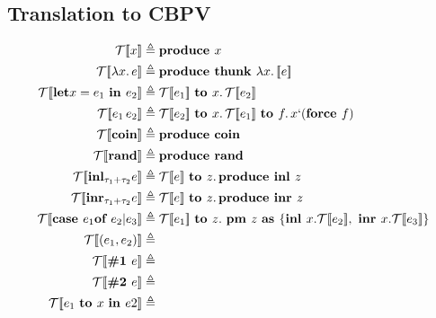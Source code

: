 \documentclass{article}
\begin{document}
\subsection{Translation to CBPV}
	\begin{equation*}
		\begin{split}
			\mathcal{T} [\![x]\!] &\triangleq 
			\text{\bf produce } x \\
			\mathcal{T} [\![\lambda x.\, e]\!] &\triangleq 
			\text{\bf produce thunk } \lambda x.\, \mathcal[\![ e ]\!] \\
			\mathcal{T} [\![\text{\bf let} x = e_1 \text{ \bf in } e_2]\!] &\triangleq 
			\mathcal{T}[\![e_1]\!] \text{ \bf to } x.\, \mathcal{T}[\![e_2]\!]\\
			\mathcal{T} [\![e_1\, e_2]\!] &\triangleq 
			\mathcal{T}[\![e_2]\!] \text{ \bf to } x.\, \mathcal{T}[\![e_1]\!] \text{ \bf to } f.\, x` (\text{\bf force } f)\\
			\mathcal{T} [\![\text{\bf coin}]\!] &\triangleq 
			\text{\bf produce coin} \\
			\mathcal{T} [\![\text{\bf rand}]\!] &\triangleq
			\text{\bf produce rand} \\
			\mathcal{T} [\![\text{\bf inl}_{\tau_1 + \tau_2} e]\!] &\triangleq
			\mathcal{T}[\![e]\!] \text{ \bf to } z.\, \text{\bf produce inl } z \\
			\mathcal{T} [\![\text{\bf inr}_{\tau_1 + \tau_2} e]\!] &\triangleq
			\mathcal{T}[\![e]\!] \text{ \bf to } z.\, \text{\bf produce inr } z \\
			\mathcal{T} [\![\text{\bf case } e_1 \text{\bf of } e_2 | e_3]\!] &\triangleq
			\mathcal{T}[\![ e_1]\!] \text{ \bf to } z. \text{ \bf pm } z \text{ \bf as } 
			\{ \text{\bf inl } x. \mathcal{T}[\![ e_2]\!], \text{ \bf inr } x. \mathcal{T}[\![ e_3]\!]\} \\
			\mathcal{T} [\![(e_1, e_2)]\!] &\triangleq \\
			\mathcal{T} [\![\text{\bf \#1 } e]\!] &\triangleq \\
			\mathcal{T} [\![\text{\bf \#2 } e]\!] &\triangleq \\
			\mathcal{T} [\![e_1 \text{ \bf to } x \text{ \bf in } e2]\!] &\triangleq \\
		\end{split}
	\end{equation*}
\end{document}
